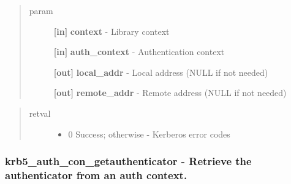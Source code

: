 \documentclass[letterpaper,10pt,english]{sphinxmanual}
\begin{document}
\begin{fulllineitems}
\label{appdev/refs/api/krb5_auth_con_getaddrs:c.krb5_auth_con_getaddrs}
\end{fulllineitems}

\begin{quote}\begin{description}
\item[{param}] \leavevmode
\textbf{{[}in{]}} \textbf{context} - Library context

\textbf{{[}in{]}} \textbf{auth\_context} - Authentication context

\textbf{{[}out{]}} \textbf{local\_addr} - Local address (NULL if not needed)

\textbf{{[}out{]}} \textbf{remote\_addr} - Remote address (NULL if not needed)

\end{description}\end{quote}
\begin{quote}\begin{description}
\item[{retval}] \leavevmode\begin{itemize}
\item {} 
0   Success; otherwise - Kerberos error codes

\end{itemize}

\end{description}\end{quote}


\subsubsection{krb5\_auth\_con\_getauthenticator -  Retrieve the authenticator from an auth context.}
\label{appdev/refs/api/krb5_auth_con_getauthenticator:krb5-auth-con-getauthenticator-retrieve-the-authenticator-from-an-auth-context}\label{appdev/refs/api/krb5_auth_con_getauthenticator::doc}
\end{document}
